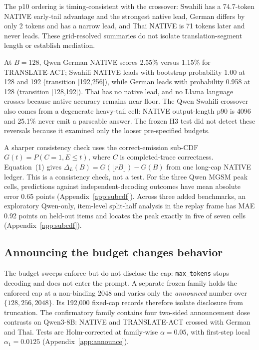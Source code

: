 \documentclass[11pt]{article}
\begin{document}
The p10 ordering is timing-consistent with the crossover: Swahili has a 74.7-token NATIVE early-tail advantage and the strongest native lead, German differs by only 2 tokens and has a narrow lead, and Thai NATIVE is 71 tokens later and never leads. These grid-resolved summaries do not isolate translation-segment length or establish mediation.

At \(B=128\), Qwen German NATIVE scores 2.55\% versus 1.15\% for TRANSLATE-ACT; Swahili NATIVE leads with bootstrap probability 1.00 at 128 and 192 (transition [192,256]), while German leads with probability 0.958 at 128 (transition [128,192]). Thai has no native lead, and no Llama language crosses because native accuracy remains near floor. The Qwen Swahili crossover also comes from a degenerate heavy-tail cell: NATIVE output-length p90 is 4096 and 25.1\% never emit a parseable answer. The frozen H3 test did not detect these reversals because it examined only the looser pre-specified budgets.

A sharper consistency check uses the correct-emission sub-CDF \(G(t)=P(C=1,E\le t)\), where \(C\) is completed-trace correctness. Equation~(1) gives \(\Delta_L(B)=G(\lfloor rB\rfloor)-G(B)\) from one long-cap NATIVE ledger. This is a consistency check, not a test. For the three Qwen MGSM peak cells, predictions against independent-decoding outcomes have mean absolute error 0.65 points (Appendix~\ref{app:subcdf}). Across three added benchmarks, an exploratory Qwen-only, item-level split-half analysis in the replay frame has MAE 0.92 points on held-out items and locates the peak exactly in five of seven cells (Appendix~\ref{app:subcdf}).

\subsection{Announcing the budget changes behavior}
\label{subsec:announce}

The budget sweeps enforce but do not disclose the cap: \texttt{max\_tokens} stops decoding and does not enter the prompt. A separate frozen family holds the enforced cap at a non-binding 2048 and varies only the \emph{announced} number over \(\{128,256,2048\}\). Its 192,000 fixed-cap records therefore isolate disclosure from truncation. The confirmatory family contains four two-sided announcement dose contrasts on Qwen3-8B: NATIVE and TRANSLATE-ACT crossed with German and Thai. Tests are Holm-corrected at family-wise \(\alpha=0.05\), with first-step local \(\alpha_1=0.0125\) (Appendix~\ref{app:announce}).
\end{document}
